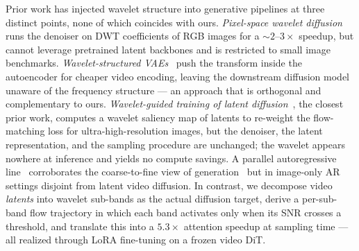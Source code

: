 Prior work has injected wavelet structure into generative pipelines at three distinct points, none of which coincides with ours. \emph{Pixel-space wavelet diffusion}~\citet{phung2023wavediff, kiruluta2025hybridwf} runs the denoiser on DWT coefficients of RGB images for a $\sim$$2$--$3\times$ speedup, but cannot leverage pretrained latent backbones and is restricted to small image benchmarks. \emph{Wavelet-structured VAEs}~\citet{li2025wfvae} push the transform inside the autoencoder for cheaper video encoding, leaving the downstream diffusion model unaware of the frequency structure --- an approach that is orthogonal and complementary to ours. \emph{Wavelet-guided training of latent diffusion}~\citet{sigillo2025lwd}, the closest prior work, computes a wavelet saliency map of latents to re-weight the flow-matching loss for ultra-high-resolution images, but the denoiser, the latent representation, and the sampling procedure are unchanged; the wavelet appears nowhere at inference and yields no compute savings. A parallel autoregressive line~\citet{huang2025spectralar, mattar2024wavelets} corroborates the coarse-to-fine view of generation~\citet{dieleman2024spectral, rissanen2023generative} but in image-only AR settings disjoint from latent video diffusion. In contrast, we decompose video \emph{latents} into wavelet sub-bands as the actual diffusion target, derive a per-sub-band flow trajectory in which each band activates only when its SNR crosses a threshold, and translate this into a $5.3\times$ attention speedup at sampling time --- all realized through LoRA fine-tuning on a frozen video DiT.
\fi

